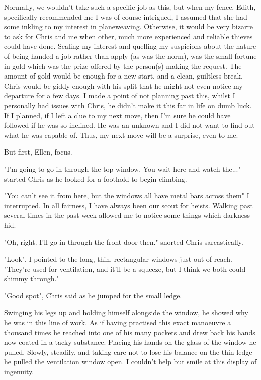 Normally, we wouldn't take such a specific job as this, but when my fence,
Edith, specifically recommended me I was of course intrigued, I assumed that she
had some inkling to my interest in planeweaving. Otherwise, it would be very
bizarre to ask for Chris and me when other, much more experienced and reliable
thieves could have done. Sealing my
interest and quelling my suspicions about the nature of being handed a job
rather than apply (as was the norm), was the small fortune in gold which was the
prize offered by the person(s) making the request. The amount of gold would be enough for a new
start, and a clean, guiltless break. Chris would be giddy enough with his split
that he might not even notice my departure for a few days. I made a point of not
planning past this, whilst I personally had issues with Chris, he didn't make it
this far in life on dumb luck. If I planned, if I left a clue to my next move,
then I'm sure he could have followed if he was so inclined. He was an unknown
and I did not want to find out what he was capable of. Thus, my next move will
be a surprise, even to me. 

But first, Ellen, focus. 

\begin{dialogue}
    \item{"I'm going to go in through the top window. You wait here and watch
    the..." started Chris as he looked for a foothold to begin climbing.}
    \item {"You can't see it from here, but the windows all have metal bars
    across them" I interrupted.
    In all fairness, I have always been our scout for heists. Walking past
    several times in the past week allowed me to notice some things which
    darkness hid.}
    \item{"Oh, right. I'll go in through the front door then." snorted Chris sarcastically.}
    \item{"Look", I pointed to the long, thin, rectangular windows just out of
    reach.
     "They're used for ventilation, and it'll be a squeeze, but I think we both could shimmy through."}
    \item{"Good spot", Chris said as he jumped for the small ledge.}
\end{dialogue}

Swinging his legs up and holding himself alongside the window, he showed why he
was in this line of work. As if having practised this exact manoeuvre a thousand
times he reached into one of his many pockets and drew back his hands now coated
in a tacky substance. Placing his hands on the glass of the window he pulled.
Slowly, steadily, and taking care not to lose his balance on the thin ledge he
pulled the ventilation window open. I couldn't help but smile at this display
of ingenuity. 

